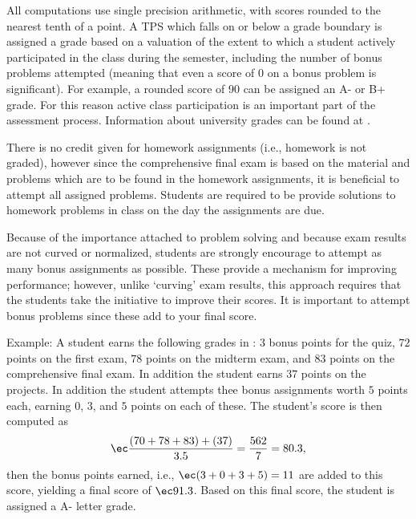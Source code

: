 All computations use single precision arithmetic, with scores rounded
to the nearest tenth of a point.
A TPS which falls on or below a grade boundary is assigned 
a grade based on a valuation of the extent to which a student
actively participated in the class
during the semester, including the number of bonus problems attempted
(meaning that even a score of 0 on a bonus problem is significant).
For example, a rounded score of 90 can be assigned an A- or B+ grade.
For this reason active class participation is an important part of the
assessment process.
Information about university grades can be found at \Urls{\GradepolicyURL}.

There is no credit
given for homework assignments (i.e., homework is not graded),
however since the comprehensive
final exam is based on the material and problems which are to be found in the
homework assignments, it is beneficial to attempt all assigned problems.
Students are required to be provide solutions to homework problems in class
on the day the assignments are due.

Because of the importance
attached to problem solving and because exam results are
not curved or normalized, students are strongly encourage to
attempt as many bonus assignments as possible. These provide a mechanism for
improving performance; however, unlike `curving' exam results, this approach
requires that the students take the initiative to improve their scores.
It is important to attempt bonus problems since these add to your final
score.

\smallskip
Example: A student earns the following grades in \Course: $3$ bonus points for
the quiz, $72$ points on the first exam, $78$ points on the midterm exam,
and $83$ points on the comprehensive final exam.
In addition the student
earns $37$ points on the projects. In addition
the student attempts thee bonus assignments worth $5$ points each, earning
$0$, $3$, and $5$ points on each of these. The student's score is then computed as
%
%
%
\begin{equation*}
\ec
\frac{(70 + 78 + 83) + (37)}{3.5} = \frac{562}{7} = 80.3,
\end{equation*}
%
%
%
then the bonus points earned, i.e., $\ec (3 + 0+ 3 + 5) = 11$ are added to
this score, yielding a final score of $\ec 91.3$.
Based on this final score, the student is assigned a {\ec A-} letter grade.
